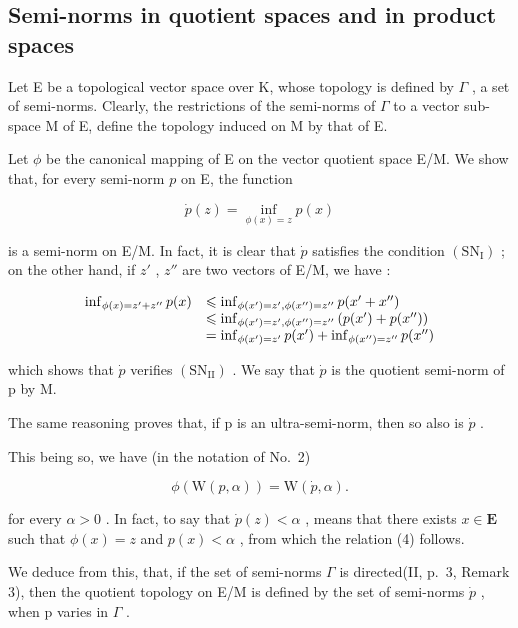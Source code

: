 \subsection{Semi-norms in quotient spaces and in product spaces}

Let E be a topological vector space over K, whose topology is defined by \(\Gamma\) , a set of semi-norms. Clearly, the restrictions of the semi-norms of \(\Gamma\) to a vector sub-space M of E, define the topology induced on M by that of E.

Let \(\phi\) be the canonical mapping of E on the vector quotient space E/M. We show that, for every semi-norm \(p\) on E, the function

\[
\dot {p} (z) = \inf _ {\phi (x) = z} p (x)\tag{3}
\]

is a semi-norm on E/M. In fact, it is clear that \(\dot{p}\) satisfies the condition \((\mathrm{SN}_{\mathrm{I}})\) ; on the other hand, if \(z'\) , \(z''\) are two vectors of E/M, we have :

\[
\begin{array}{r l} \inf _ {\phi (x) = z ^ {\prime} + z ^ {\prime \prime}} p (x) & \leqslant \inf _ {\phi (x ^ {\prime}) = z ^ {\prime}, \phi (x ^ {\prime \prime}) = z ^ {\prime \prime}} p (x ^ {\prime} + x ^ {\prime \prime}) \\ & \leqslant \inf _ {\phi (x ^ {\prime}) = z ^ {\prime}, \phi (x ^ {\prime \prime}) = z ^ {\prime \prime}} \left(p (x ^ {\prime}) + p (x ^ {\prime \prime})\right) \\ & = \inf _ {\phi (x ^ {\prime}) = z ^ {\prime}} p (x ^ {\prime}) + \inf _ {\phi (x ^ {\prime \prime}) = z ^ {\prime \prime}} p (x ^ {\prime \prime}) \end{array}
\]

which shows that \(\dot{p}\) verifies \((\mathrm{SN}_{\mathrm{II}})\) . We say that \(\dot{p}\) is the quotient semi-norm of p by M.

The same reasoning proves that, if p is an ultra-semi-norm, then so also is \(\dot{p}\) .

This being so, we have (in the notation of No.~2)

\[
\phi (\mathrm{W} (p, \alpha)) = \mathrm{W} (\dot {p}, \alpha).\tag{4}
\]

for every \(\alpha > 0\) . In fact, to say that \(\dot{p}(z) < \alpha\) , means that there exists \(x \in \mathbf{E}\) such that \(\phi(x) = z\) and \(p(x) < \alpha\) , from which the relation (4) follows.

We deduce from this, that, if the set of semi-norms \(\Gamma\) is directed(II, p.~3, Remark 3), then the quotient topology on E/M is defined by the set of semi-norms \(\dot{p}\) , when p varies in \(\Gamma\) .

